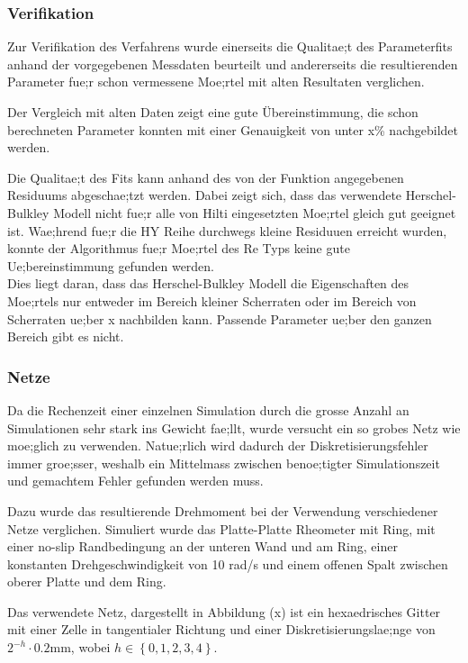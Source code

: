 \subsubsection{Verifikation}
Zur Verifikation des Verfahrens wurde einerseits die Qualitae;t des Parameterfits anhand der vorgegebenen Messdaten beurteilt und andererseits die resultierenden Parameter fue;r schon vermessene Moe;rtel mit alten Resultaten verglichen.

Der Vergleich mit alten Daten zeigt eine gute Übereinstimmung, die schon berechneten Parameter konnten mit einer Genauigkeit von unter x\%  nachgebildet werden.

Die Qualitae;t des Fits kann anhand des von der Funktion  angegebenen Residuums abgeschae;tzt werden. Dabei zeigt sich, dass das verwendete Herschel-Bulkley Modell nicht fue;r alle von Hilti eingesetzten Moe;rtel gleich gut geeignet ist. Wae;hrend fue;r die HY Reihe  durchwegs kleine Residuuen  erreicht wurden, konnte der Algorithmus fue;r Moe;rtel des Re Typs keine gute Ue;bereinstimmung gefunden werden.\\
Dies liegt daran, dass das Herschel-Bulkley Modell die Eigenschaften des Moe;rtels nur entweder im Bereich kleiner Scherraten  oder im Bereich von Scherraten ue;ber x nachbilden kann. Passende Parameter ue;ber den ganzen Bereich gibt es nicht.
%
\subsubsection{Netze}
Da die Rechenzeit einer einzelnen Simulation durch die grosse Anzahl an Simulationen sehr stark ins Gewicht fae;llt, wurde versucht ein so grobes Netz wie moe;glich zu verwenden. Natue;rlich wird dadurch der Diskretisierungsfehler immer groe;sser, weshalb ein Mittelmass zwischen benoe;tigter Simulationszeit und gemachtem Fehler gefunden werden muss.

Dazu wurde das resultierende Drehmoment bei der Verwendung verschiedener Netze verglichen. Simuliert wurde das Platte-Platte Rheometer mit Ring, mit einer no-slip Randbedingung an der unteren Wand und am Ring, einer konstanten Drehgeschwindigkeit von 10 rad/s und einem offenen Spalt zwischen oberer Platte und dem Ring.

Das verwendete Netz, dargestellt in Abbildung (x)  ist ein hexaedrisches Gitter mit einer Zelle in tangentialer Richtung und einer Diskretisierungslae;nge von $2^{-h} \cdot 0.2\mbox{mm}$, wobei $h\in\left\{ 0,1,2,3,4 \right\}$.

